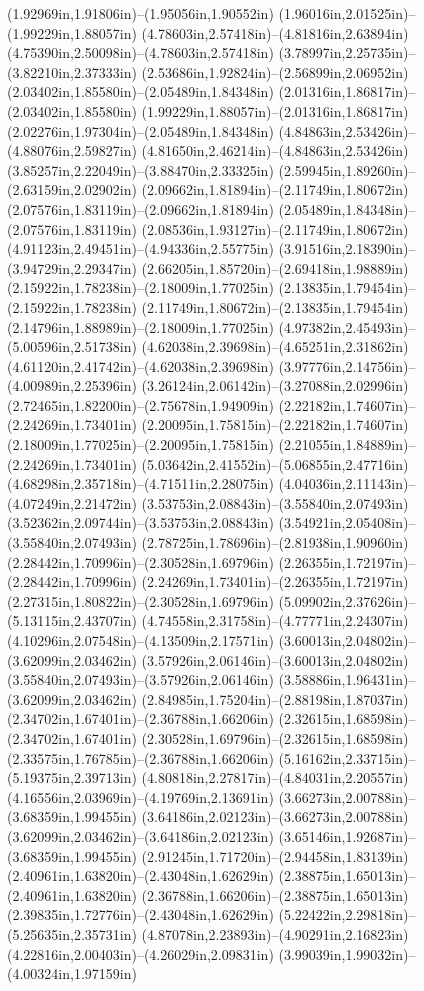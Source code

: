 (1.92969in,1.91806in)--(1.95056in,1.90552in) (1.96016in,2.01525in)--(1.99229in,1.88057in) (4.78603in,2.57418in)--(4.81816in,2.63894in) (4.75390in,2.50098in)--(4.78603in,2.57418in) (3.78997in,2.25735in)--(3.82210in,2.37333in) (2.53686in,1.92824in)--(2.56899in,2.06952in) (2.03402in,1.85580in)--(2.05489in,1.84348in) (2.01316in,1.86817in)--(2.03402in,1.85580in) (1.99229in,1.88057in)--(2.01316in,1.86817in) (2.02276in,1.97304in)--(2.05489in,1.84348in) (4.84863in,2.53426in)--(4.88076in,2.59827in) (4.81650in,2.46214in)--(4.84863in,2.53426in) (3.85257in,2.22049in)--(3.88470in,2.33325in) (2.59945in,1.89260in)--(2.63159in,2.02902in) (2.09662in,1.81894in)--(2.11749in,1.80672in) (2.07576in,1.83119in)--(2.09662in,1.81894in) (2.05489in,1.84348in)--(2.07576in,1.83119in) (2.08536in,1.93127in)--(2.11749in,1.80672in) (4.91123in,2.49451in)--(4.94336in,2.55775in) (3.91516in,2.18390in)--(3.94729in,2.29347in) (2.66205in,1.85720in)--(2.69418in,1.98889in) (2.15922in,1.78238in)--(2.18009in,1.77025in) (2.13835in,1.79454in)--(2.15922in,1.78238in) (2.11749in,1.80672in)--(2.13835in,1.79454in) (2.14796in,1.88989in)--(2.18009in,1.77025in) (4.97382in,2.45493in)--(5.00596in,2.51738in) (4.62038in,2.39698in)--(4.65251in,2.31862in) (4.61120in,2.41742in)--(4.62038in,2.39698in) (3.97776in,2.14756in)--(4.00989in,2.25396in) (3.26124in,2.06142in)--(3.27088in,2.02996in) (2.72465in,1.82200in)--(2.75678in,1.94909in) (2.22182in,1.74607in)--(2.24269in,1.73401in) (2.20095in,1.75815in)--(2.22182in,1.74607in) (2.18009in,1.77025in)--(2.20095in,1.75815in) (2.21055in,1.84889in)--(2.24269in,1.73401in) (5.03642in,2.41552in)--(5.06855in,2.47716in) (4.68298in,2.35718in)--(4.71511in,2.28075in) (4.04036in,2.11143in)--(4.07249in,2.21472in) (3.53753in,2.08843in)--(3.55840in,2.07493in) (3.52362in,2.09744in)--(3.53753in,2.08843in) (3.54921in,2.05408in)--(3.55840in,2.07493in) (2.78725in,1.78696in)--(2.81938in,1.90960in) (2.28442in,1.70996in)--(2.30528in,1.69796in) (2.26355in,1.72197in)--(2.28442in,1.70996in) (2.24269in,1.73401in)--(2.26355in,1.72197in) (2.27315in,1.80822in)--(2.30528in,1.69796in) (5.09902in,2.37626in)--(5.13115in,2.43707in) (4.74558in,2.31758in)--(4.77771in,2.24307in) (4.10296in,2.07548in)--(4.13509in,2.17571in) (3.60013in,2.04802in)--(3.62099in,2.03462in) (3.57926in,2.06146in)--(3.60013in,2.04802in) (3.55840in,2.07493in)--(3.57926in,2.06146in) (3.58886in,1.96431in)--(3.62099in,2.03462in) (2.84985in,1.75204in)--(2.88198in,1.87037in) (2.34702in,1.67401in)--(2.36788in,1.66206in) (2.32615in,1.68598in)--(2.34702in,1.67401in) (2.30528in,1.69796in)--(2.32615in,1.68598in) (2.33575in,1.76785in)--(2.36788in,1.66206in) (5.16162in,2.33715in)--(5.19375in,2.39713in) (4.80818in,2.27817in)--(4.84031in,2.20557in) (4.16556in,2.03969in)--(4.19769in,2.13691in) (3.66273in,2.00788in)--(3.68359in,1.99455in) (3.64186in,2.02123in)--(3.66273in,2.00788in) (3.62099in,2.03462in)--(3.64186in,2.02123in) (3.65146in,1.92687in)--(3.68359in,1.99455in) (2.91245in,1.71720in)--(2.94458in,1.83139in) (2.40961in,1.63820in)--(2.43048in,1.62629in) (2.38875in,1.65013in)--(2.40961in,1.63820in) (2.36788in,1.66206in)--(2.38875in,1.65013in) (2.39835in,1.72776in)--(2.43048in,1.62629in) (5.22422in,2.29818in)--(5.25635in,2.35731in) (4.87078in,2.23893in)--(4.90291in,2.16823in) (4.22816in,2.00403in)--(4.26029in,2.09831in) (3.99039in,1.99032in)--(4.00324in,1.97159in) 
